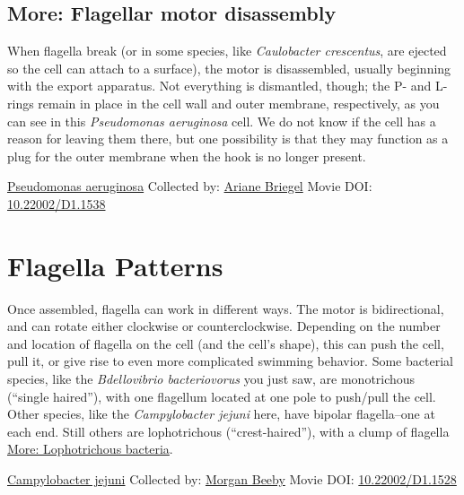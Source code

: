 \documentclass[]{tufte-book}
\begin{document}
\hypertarget{Flagellar_motor_disassembly}{%
\subsection*{More: Flagellar motor disassembly}\label{Flagellar_motor_disassembly}}

When flagella break (or in some species, like \emph{Caulobacter crescentus}, are ejected so the cell can attach to a surface), the motor is disassembled, usually beginning with the export apparatus. Not everything is dismantled, though; the P- and L-rings remain in place in the cell wall and outer membrane, respectively, as you can see in this \emph{Pseudomonas aeruginosa} cell. We do not know if the cell has a reason for leaving them there, but one possibility is that they may function as a plug for the outer membrane when the hook is no longer present.



\hypertarget{htmlwidget-5e4b6c82f46875c2999b}{}

\label{fig:6-3a}\protect\hyperlink{tree}{Pseudomonas aeruginosa} Collected by: \protect\hyperlink{ariane_briegel}{Ariane Briegel} Movie DOI: \href{https://doi.org/10.22002/D1.1538}{10.22002/D1.1538}

\hypertarget{flagella-patterns}{%
\section{Flagella Patterns}\label{flagella-patterns}}

Once assembled, flagella can work in different ways. The motor is bidirectional, and can rotate either clockwise or counterclockwise. Depending on the number and location of flagella on the cell (and the cell's shape), this can push the cell, pull it, or give rise to even more complicated swimming behavior. Some bacterial species, like the \emph{Bdellovibrio bacteriovorus} you just saw, are monotrichous (``single haired''), with one flagellum located at one pole to push/pull the cell. Other species, like the \emph{Campylobacter jejuni} here, have bipolar flagella--one at each end. Still others are lophotrichous (``crest-haired''), with a clump of flagella \protect\hyperlink{Lophotrichous_bacteria}{More: Lophotrichous bacteria}.



\hypertarget{htmlwidget-c5caa48d1f8cf0ba4865}{}

\label{fig:6-4}\protect\hyperlink{tree}{Campylobacter jejuni} Collected by: \protect\hyperlink{morgan_beeby}{Morgan Beeby} Movie DOI: \href{https://doi.org/10.22002/D1.1528}{10.22002/D1.1528}
\end{document}
